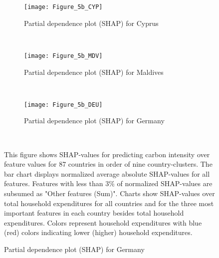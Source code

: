 \begin{figure}[ht!]\ContinuedFloat
    \centering
   \begin{subfigure}[b]{\textwidth}
         \centering
         \caption{Partial dependence plot (SHAP) for Cyprus}
         \label{fig:5b_CYP}
         \texttt{[image: Figure\_5b\_CYP]}         
     \end{subfigure}
    \\
    \vspace{0.5cm}
   \begin{subfigure}[b]{\textwidth}
         \centering
         \caption{Partial dependence plot (SHAP) for Maldives}
         \label{fig:5b_MDV}
         \texttt{[image: Figure\_5b\_MDV]}         
     \end{subfigure}
    \\
    \vspace{0.5cm}
   \begin{subfigure}[b]{\textwidth}
         \centering
         \caption{Partial dependence plot (SHAP) for Germany}
         \label{fig:5b_DEU}
         \texttt{[image: Figure\_5b\_DEU]}
    \end{subfigure}
    \\
    \vspace{0.5cm}
    \begin{subcaption2}
     This figure shows SHAP-values for predicting carbon intensity over feature values for 87 countries in order of nine country-clusters. The bar chart displays normalized average absolute SHAP-values for all features. Features with less than 3\% of normalized SHAP-values are subsumed as "Other features (Sum)". Charts show SHAP-values over total household expenditures for all countries and for the three most important features in each country besides total household expenditures. Colors represent household expenditures with blue (red) colors indicating lower (higher) household expenditures.
     \end{subcaption2}
\end{figure}

